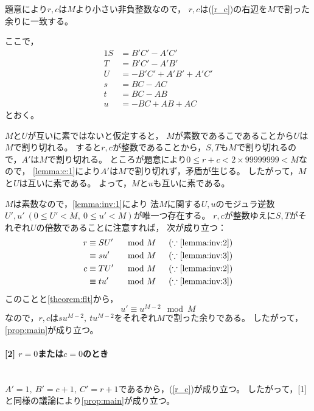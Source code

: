 \documentclass{article}
\makeatletter
\renewenvironment{proof}[1][\proofname]{\par
        \pushQED{\qed}
        \normalfont
        \topsep6\p@\@plus6\p@ \trivlist
        \item[\hskip\labelsep{\bfseries #1}\@addpunct{\bfseries}]\ignorespaces
    }{%
        \popQED\endtrivlist\@endpefalse
    }
\renewcommand{\proofname}{証明.}
\newcommand{\myparagraph}[1]{\paragraph{#1}\mbox{}\\}
\makeatother
\begin{document}
\begin{proof}
    題意により$r, c$は$M$より小さい非負整数なので，
    $r, c$は(\ref{r_c})の右辺を$M$で割った余りに一致する。

    ここで，
    \begin{alignat}{1}
        S &= B'C' - A'C' \\
        T &= B'C' - A'B' \\
        U &= -B'C' + A'B' + A'C' \\
        s &= BC - AC \\
        t &= BC - AB \\
        u &= -BC + AB + AC
    \end{alignat}
    とおく。

    $M$と$U$が互いに素ではないと仮定すると，
    $M$が素数であるこであることから$U$は$M$で割り切れる。
    すると$r, c$が整数であることから，$S, T$も$M$で割り切れるので，$A'$は$M$で割り切れる。
    ところが題意により$0 \leq r + c < 2 \times 99999999 < M$なので，
    \cref{lemma:c:1}により$A'$は$M$で割り切れず，矛盾が生じる。
    したがって，$M$と$U$は互いに素である。
    よって，$M$と$u$も互いに素である。

    $M$は素数なので，\cref{lemma:inv:1}により
    法$M$に関する$U, u$のモジュラ逆数$U', u'\ (0 \leq U' < M,\ 0 \leq u' < M)$が唯一つ存在する。
    $r, c$が整数ゆえに$S, T$がそれぞれ$U$の倍数であることに注意すれば，
    次が成り立つ：
    \begin{alignat}{2}
        r &\equiv SU' & &\mod{M} \hspace{15pt} (\because \mbox{\cref{lemma:inv:2}}) \\
          &\equiv su' & &\mod{M} \hspace{15pt} (\because \mbox{\cref{lemma:inv:3}}) \\
        c &\equiv TU' & &\mod{M} \hspace{15pt} (\because \mbox{\cref{lemma:inv:2}}) \\
          &\equiv tu' & &\mod{M} \hspace{15pt} (\because \mbox{\cref{lemma:inv:3}})
    \end{alignat}
    このことと\cref{theorem:flt}から，
    \begin{equation}
        u' \equiv u^{M - 2} \mod{M}
    \end{equation}
    なので，$r, c$は$su^{M - 2},\ tu^{M - 2}$をそれぞれ$M$で割った余りである。
    したがって，\cref{prop:main}が成り立つ。

    \myparagraph{[2] $r = 0$または$c = 0$のとき}

    $A' = 1,\ B' = c + 1,\ C' = r + 1$であるから，(\ref{r_c})が成り立つ。
    したがって，[1]と同様の議論により\cref{prop:main}が成り立つ。
\end{proof}
\end{document}
